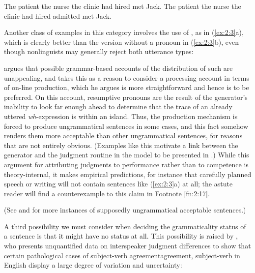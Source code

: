 \ea \label{ex:2:2}
\ea
The patient the nurse the clinic had hired met Jack.
\ex
The patient the nurse the clinic had hired admitted met Jack.
\z
\z

\noindent
Another class of examples in this category involves the use of , as in (\ref{ex:2:3}a), which is clearly better than the version without a pronoun in (\ref{ex:2:3}b), even though nonlinguists may generally reject both utterance types:

\ea\label{ex:2:3}
\z
\z


\noindent
\citet{Kroch1981} argues that possible grammar-based accounts of the distribution of such  are unappealing, and takes this as a reason to consider a processing account in terms of on-line production, which he argues is more straightforward and hence is to be preferred. On this account, resumptive pronouns are the result of the generator's inability to look far enough ahead to determine that the trace of an already uttered \textit{wh}-expression is within an island. Thus, the production mechanism is forced to produce ungrammatical sentences in some cases, and this fact somehow renders them more acceptable than other ungrammatical sentences, for reasons that are not entirely obvious. (Examples like this motivate a link between the generator and the judgment routine in the model to be presented in .) While this argument for attributing judgments to performance rather than to competence is theory-internal, it makes empirical predictions, for instance that carefully planned speech or writing will not contain sentences like (\ref{ex:2:3}a) at all; the astute reader will find a counterexample to this claim in Footnote \ref{fn:2:17}.

(See \citealt{LangendoenEtAl1973} and \citealt{Bever1974} for more instances of supposedly ungrammatical  acceptable sentences.)

A third possibility we must consider when deciding the grammaticality status of a sentence is that it might have no status at all. This possibility is raised by \citet{Morgan1972}, who presents unquantified data on interspeaker judgment differences to show that certain pathological cases of subject-verb agreement{agreement, subject-verb} in English display a large degree of variation and uncertainty:

